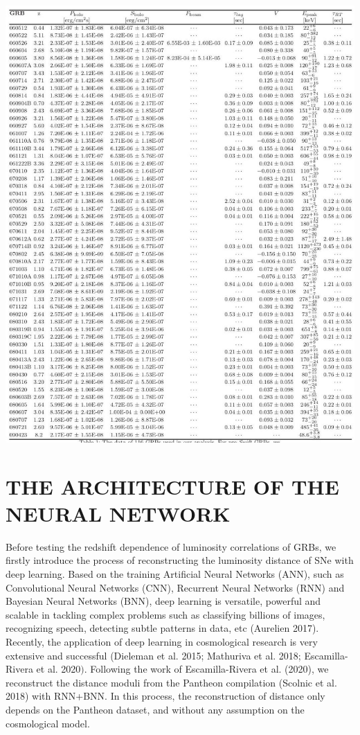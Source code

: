 \documentclass[10pt, a4paper]{article}
\begin{document}
\includegraphics[max width=\textwidth]{GRB_dataset_2.jpg}

\section{THE ARCHITECTURE OF THE NEURAL NETWORK}
Before testing the redshift dependence of luminosity correlations of GRBs, we firstly introduce the process of reconstructing the luminosity distance of SNe with deep learning. Based on the training Artificial Neural Networks (ANN), such as Convolutional Neural Networks (CNN), Recurrent Neural Networks (RNN) and Bayesian Neural Networks (BNN), deep learning is versatile, powerful and scalable in tackling complex problems such as classifying billions of images, recognizing speech, detecting subtle patterns in data, etc (Aurelien 2017). Recently, the application of deep learning in cosmological research is very extensive and successful (Dieleman et al. 2015; Mathuriva et al. 2018; Escamilla-Rivera et al. 2020$)$. Following the work of Escamilla-Rivera et al. (2020), we reconstruct the distance moduli from the Pantheon compilation (Scolnic et al. 2018) with RNN+BNN. In this process, the reconstruction of distance only depends on the Pantheon dataset, and without any assumption on the cosmological model.
\end{document}
